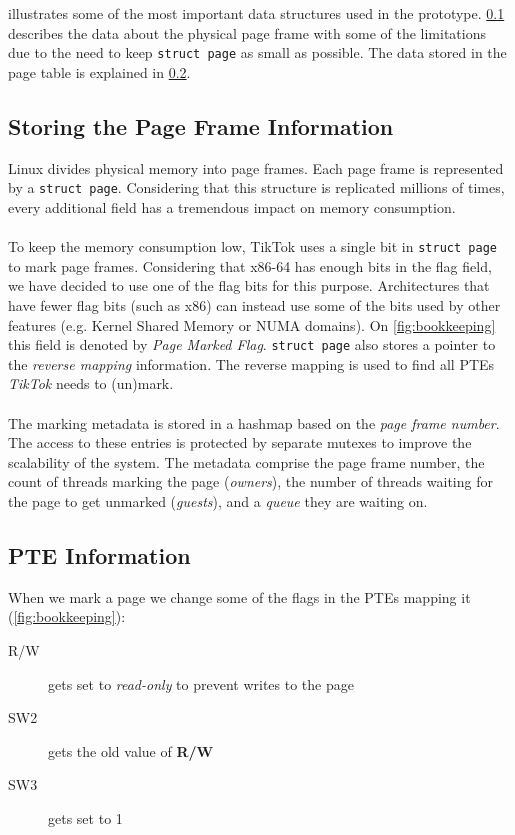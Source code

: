  illustrates some of the most important data structures used in the prototype.
\cref{subsec:frameinfo} describes the data about the physical page
frame with some of the limitations due to the need to keep \texttt{struct page} as small as possible.
The data stored in the page table is explained in \cref{subsec:pageinfo}.

\subsection{Storing the Page Frame Information}
\label{subsec:frameinfo}
Linux divides physical memory into page frames. Each page frame is represented
by a \texttt{struct page}. Considering that this structure is replicated
millions of times, every additional field has a tremendous impact on memory
consumption.
\\
\\
To keep the memory consumption low, TikTok uses a single bit in \texttt{struct
page} to mark page frames. Considering that x86-64 has enough bits in the flag
field, we have decided to use one of the flag bits for this purpose.
Architectures that have fewer flag bits (such as x86) can instead use some of
the bits used by other features (e.g. Kernel Shared Memory or NUMA domains). On
\cref{fig:bookkeeping} this field is denoted by \emph{Page Marked Flag}.
\texttt{struct page} also stores a pointer to the \emph{reverse mapping}
information. The reverse mapping is used to find all PTEs \emph{TikTok} needs to
(un)mark.
\\
\\
The marking metadata is stored in a hashmap based on the \emph{page frame
number}. The access to these entries is protected by separate mutexes to improve
the scalability of the system. The metadata comprise the page frame number, the
count of threads marking the page (\emph{owners}), the number of threads waiting
for the page to get unmarked (\emph{guests}), and a \emph{queue} they are
waiting on. 

\subsection{PTE Information}
\label{subsec:pageinfo}

When we mark a page we change some of the flags in the PTEs mapping it
(\cref{fig:bookkeeping}):

\begin{description}
  \item[R/W] gets set to \emph{read-only} to prevent writes to the page
  \item[SW2] gets the old value of \textbf{R/W}
  \item[SW3] gets set to 1 
\end{description}

